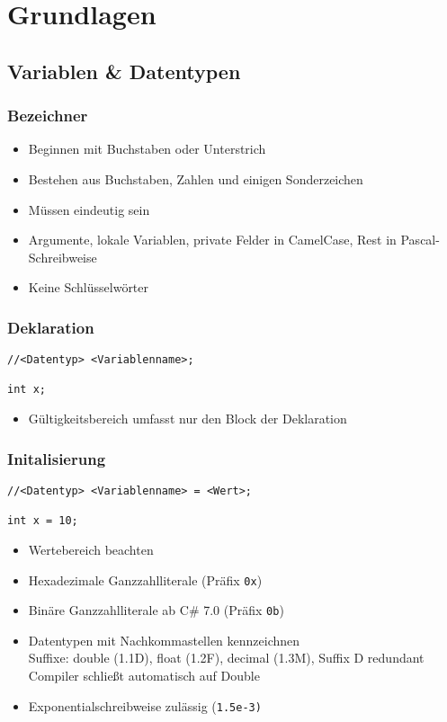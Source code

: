 \chapter{Grundlagen} 
\section{Variablen \& Datentypen}
\subsection{Bezeichner}
\begin{itemize}
\item Beginnen mit Buchstaben oder Unterstrich
\item Bestehen aus Buchstaben, Zahlen und einigen Sonderzeichen
\item Müssen eindeutig sein
\item Argumente, lokale Variablen, private Felder in CamelCase, Rest in Pascal-Schreibweise
\item Keine Schlüsselwörter
\end{itemize}
\subsection{Deklaration}
\begin{lstlisting}
//<Datentyp> <Variablenname>;

int x;
\end{lstlisting}
\begin{itemize}
\item Gültigkeitsbereich umfasst nur den Block der Deklaration
\end{itemize}
\subsection{Initalisierung}
\begin{lstlisting}
//<Datentyp> <Variablenname> = <Wert>;

int x = 10;
\end{lstlisting}
\begin{itemize}
\item Wertebereich beachten
\item Hexadezimale Ganzzahlliterale (Präfix \texttt{0x})
\item Binäre Ganzzahlliterale ab C\# 7.0 (Präfix \texttt{0b})
\item Datentypen mit Nachkommastellen kennzeichnen\\
Suffixe: double (1.1D), float (1.2F), decimal (1.3M), Suffix D redundant Compiler schließt automatisch auf Double
\item Exponentialschreibweise zulässig (\texttt{1.5e-3)}
\end{itemize}
